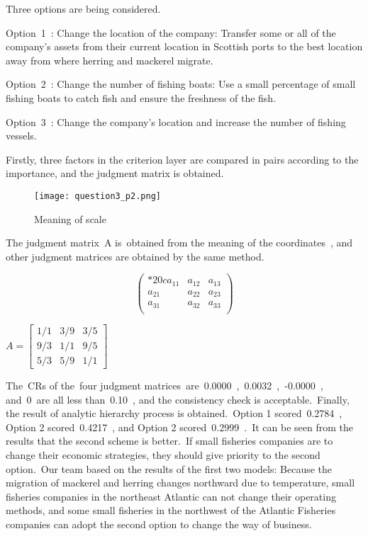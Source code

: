 \documentclass{mcmthesis}
\begin{document}
Three options are being considered.

Option 1 : Change the location of the company: Transfer some or all of the company's assets from their current location in Scottish ports to the best location away from where herring and mackerel migrate.

Option 2 : Change the number of fishing boats: Use a small percentage of small fishing boats to catch fish and ensure the freshness of the fish.

Option 3 : Change the company's location and increase the number of fishing vessels.

Firstly, three factors in the criterion layer are compared in pairs according to the importance, and the judgment matrix is obtained.

\begin{figure}[!htp]
	\centering
	\texttt{[image: question3\_p2.png]}\\
	\caption{Meaning of scale}
\end{figure}

The judgment matrix A is obtained from the meaning of the coordinates , and other judgment matrices are obtained by the same method.

\[
\begin{pmatrix}{*{20}c}
{a_{11} } & {a_{12} } & {a_{13} }  \\
{a_{21} } & {a_{22} } & {a_{23} }  \\
{a_{31} } & {a_{32} } & {a_{33} }  \\
\end{pmatrix}
\]

$
A=\left[\begin{array}{ccc}
{1 / 1} & {3 / 9} & {3 / 5}  \\
{9 / 3} & {1 / 1} & {9 / 5}  \\
{5 / 3} & {5 / 9} & {1 / 1}  
\end{array}\right]
$

The CRs of the four judgment matrices are 0.0000 , 0.0032 , -0.0000 , and 0 are all less than 0.10 , and the consistency check is acceptable. Finally, the result of analytic hierarchy process is obtained. Option 1 scored 0.2784 , Option 2 scored 0.4217 , and Option 2 scored 0.2999 . It can be seen from the results that the second scheme is better. If small fisheries companies are to change their economic strategies, they should give priority to the second option. Our team based on the results of the first two models: Because the migration of mackerel and herring changes northward due to temperature, small fisheries companies in the northeast Atlantic can not change their operating methods, and some small fisheries in the northwest of the Atlantic Fisheries companies can adopt the second option to change the way of business.
\end{document}
